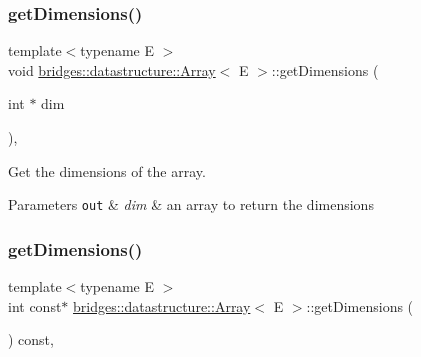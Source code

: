 \subsubsection{\texorpdfstring{get\+Dimensions()}{getDimensions()}\hspace{0.1cm}{\footnotesize\ttfamily [1/2]}}
{\footnotesize\ttfamily template$<$typename E $>$ \\
void \hyperlink{classbridges_1_1datastructure_1_1_array}{bridges\+::datastructure\+::\+Array}$<$ E $>$\+::get\+Dimensions (\begin{DoxyParamCaption}\item[{int $\ast$}]{dim }\end{DoxyParamCaption})\hspace{0.3cm}{\ttfamily [inline]}, {\ttfamily [protected]}}



Get the dimensions of the array. 


\begin{DoxyParams}[1]{Parameters}
\mbox{\tt out}  & {\em dim} & an array to return the dimensions \\
\hline
\end{DoxyParams}
\mbox{\label{classbridges_1_1datastructure_1_1_array_a6d9edc546fa172a47f19de3c2ea93ebf}} 
\subsubsection{\texorpdfstring{get\+Dimensions()}{getDimensions()}\hspace{0.1cm}{\footnotesize\ttfamily [2/2]}}
{\footnotesize\ttfamily template$<$typename E $>$ \\
int const$\ast$ \hyperlink{classbridges_1_1datastructure_1_1_array}{bridges\+::datastructure\+::\+Array}$<$ E $>$\+::get\+Dimensions (\begin{DoxyParamCaption}{ }\end{DoxyParamCaption}) const\hspace{0.3cm}{\ttfamily [inline]}, {\ttfamily [protected]}}

\mbox{\label{classbridges_1_1datastructure_1_1_array_a3b6d694fe5d336a0a15951d522852e51}} 
